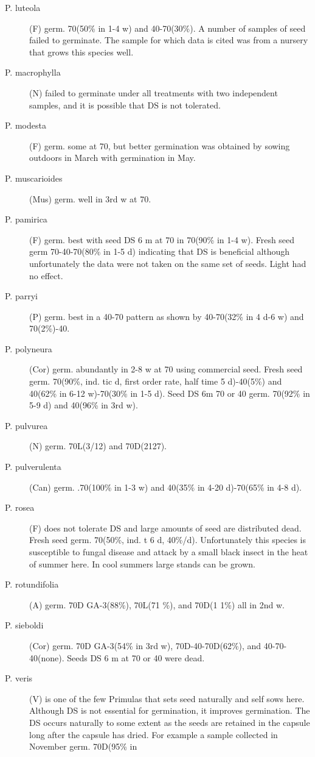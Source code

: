 \begin{description}
\item[P. luteola] (F) germ. 70(50\% in 1-4 w) and 40-70(30\%). A number of samples of
seed failed to germinate. The sample for which data is cited was from a nursery that
grows this species well.
\item[P. macrophylla] (N) failed to germinate under all treatments with two
independent samples, and it is possible that DS is not tolerated.
\item[P. modesta] (F) germ. some at 70, but better germination was obtained by
sowing outdoors in March with germination in May.
\item[P. muscarioides] (Mus) germ. well in 3rd w at 70.
\item[P. pamirica] (F) germ. best with seed DS 6 m at 70 in 70(90\% in 1-4 w). Fresh
seed germ 70-40-70(80\% in 1-5 d) indicating that DS is beneficial although
unfortunately the data were not taken on the same set of seeds. Light had no effect.
\item[P. parryi] (P) germ. best in a 40-70 pattern as shown by 40-70(32\% in 4 d-6 w)
and 70(2\%)-40.
\item[P. polyneura] (Cor) germ. abundantly in 2-8 w at 70 using commercial seed.
Fresh seed germ. 70(90\%, ind. tic d, first order rate, half time 5 d)-40(5\%) and
40(62\% in 6-12 w)-70(30\% in 1-5 d). Seed DS 6m 70 or 40 germ. 70(92\% in 5-9 d)
and 40(96\% in 3rd w).
\item[P. pulvurea] (N) germ. 70L(3/12) and 70D(2127).
\item[P. pulverulenta] (Can) germ. .70(100\% in 1-3 w) and 40(35\% in 4-20 d)-70(65\%
in 4-8 d).
\item[P. rosea] (F) does not tolerate DS and large amounts of seed are distributed
dead. Fresh seed germ. 70(50\%, ind. t 6 d, 40\%/d). Unfortunately this species is
susceptible to fungal disease and attack by a small black insect in the heat of summer
here. In cool summers large stands can be grown.
\item[P. rotundifolia] (A) germ. 70D GA-3(88\%), 70L(71 \%), and 70D(1 1\%) all in 2nd w.
\item[P. sieboldi] (Cor) germ. 70D GA-3(54\% in 3rd w), 70D-40-70D(62\%), and 40-70-
40(none). Seeds DS 6 m at 70 or 40 were dead.
\item[P. veris] (V) is one of the few Primulas that sets seed naturally and self sows
here. Although DS is not essential for germination, it improves germination. The DS
occurs naturally to some extent as the seeds are retained in the capsule long after the
capsule has dried. For example a sample collected in November germ. 70D(95\% in

\end{description}
